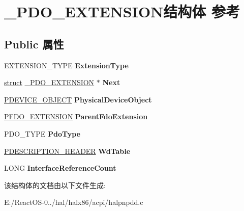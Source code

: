 \hypertarget{struct___p_d_o___e_x_t_e_n_s_i_o_n}{}\section{\+\_\+\+P\+D\+O\+\_\+\+E\+X\+T\+E\+N\+S\+I\+O\+N结构体 参考}
\label{struct___p_d_o___e_x_t_e_n_s_i_o_n}
\subsection*{Public 属性}
\begin{DoxyCompactItemize}
\item 
\mbox{\label{struct___p_d_o___e_x_t_e_n_s_i_o_n_af2dd7555dfe24d8fad9f103c81036835}} 
E\+X\+T\+E\+N\+S\+I\+O\+N\+\_\+\+T\+Y\+PE {\bfseries Extension\+Type}
\item 
\mbox{\label{struct___p_d_o___e_x_t_e_n_s_i_o_n_ab6f38aca28e6640cc9f0e02ae3d27230}} 
\hyperlink{interfacestruct}{struct} \hyperlink{struct___p_d_o___e_x_t_e_n_s_i_o_n}{\+\_\+\+P\+D\+O\+\_\+\+E\+X\+T\+E\+N\+S\+I\+ON} $\ast$ {\bfseries Next}
\item 
\mbox{\label{struct___p_d_o___e_x_t_e_n_s_i_o_n_a3929a1bd90e2e69d4c1c5555d44ac54b}} 
\hyperlink{struct___d_e_v_i_c_e___o_b_j_e_c_t}{P\+D\+E\+V\+I\+C\+E\+\_\+\+O\+B\+J\+E\+CT} {\bfseries Physical\+Device\+Object}
\item 
\mbox{\label{struct___p_d_o___e_x_t_e_n_s_i_o_n_adad8a71a358e0c853e6d847b9b66c688}} 
\hyperlink{struct___f_d_o___e_x_t_e_n_s_i_o_n}{P\+F\+D\+O\+\_\+\+E\+X\+T\+E\+N\+S\+I\+ON} {\bfseries Parent\+Fdo\+Extension}
\item 
\mbox{\label{struct___p_d_o___e_x_t_e_n_s_i_o_n_af838b88c6f81778e10e2c54e204dc18f}} 
P\+D\+O\+\_\+\+T\+Y\+PE {\bfseries Pdo\+Type}
\item 
\mbox{\label{struct___p_d_o___e_x_t_e_n_s_i_o_n_a50769e7c6471435d264a587ac4acb104}} 
\hyperlink{struct___d_e_s_c_r_i_p_t_i_o_n___h_e_a_d_e_r}{P\+D\+E\+S\+C\+R\+I\+P\+T\+I\+O\+N\+\_\+\+H\+E\+A\+D\+ER} {\bfseries Wd\+Table}
\item 
\mbox{\label{struct___p_d_o___e_x_t_e_n_s_i_o_n_ae7a7e0d0a42bb124241dc6c0e9fd74ef}} 
L\+O\+NG {\bfseries Interface\+Reference\+Count}
\end{DoxyCompactItemize}


该结构体的文档由以下文件生成\+:\begin{DoxyCompactItemize}
\item 
E\+:/\+React\+O\+S-\/0../hal/halx86/acpi/halpnpdd.\+c\end{DoxyCompactItemize}
